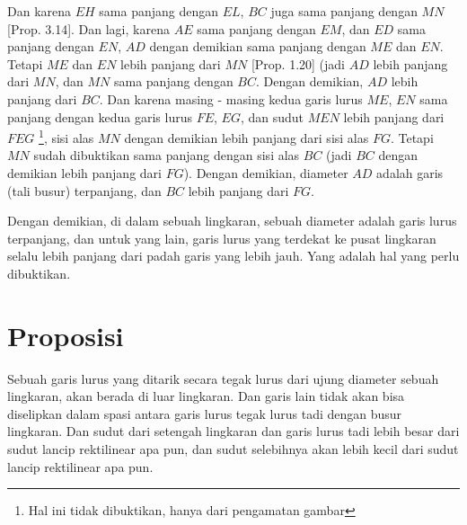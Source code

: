 \documentclass[a4paper]{book}
\begin{document}
Dan karena $EH$ sama panjang dengan $EL$, $BC$ juga sama panjang dengan $MN$
[Prop. 3.14]. Dan lagi, karena $AE$ sama panjang dengan $EM$, dan $ED$ sama 
panjang dengan $EN$, $AD$ dengan demikian sama panjang dengan $ME$ dan $EN$.
Tetapi $ME$ dan $EN$ lebih panjang dari $MN$ [Prop. 1.20] (jadi $AD$ lebih
panjang dari $MN$, dan $MN$ sama panjang dengan $BC$. Dengan demikian, $AD$
lebih panjang dari $BC$. Dan karena masing - masing kedua garis lurus $ME$, 
$EN$ sama panjang dengan kedua garis lurus $FE$, $EG$, dan sudut $MEN$ lebih
panjang dari $FEG$ \footnote{Hal ini tidak dibuktikan, hanya dari pengamatan
gambar}, sisi alas $MN$ dengan demikian lebih panjang dari sisi alas $FG$. Tetapi $MN$ sudah dibuktikan sama panjang dengan sisi alas $BC$ 
(jadi $BC$ dengan demikian lebih panjang dari $FG$). Dengan demikian, diameter
$AD$ adalah garis (tali busur) terpanjang, dan $BC$ lebih panjang dari $FG$.

Dengan demikian, di dalam sebuah lingkaran, sebuah diameter adalah garis lurus
terpanjang, dan untuk yang lain, garis lurus yang terdekat ke pusat lingkaran
selalu lebih panjang dari padah garis yang lebih jauh. Yang adalah hal yang
perlu dibuktikan.

\section*{\centering Proposisi \thesection}

Sebuah garis lurus yang ditarik secara tegak lurus dari ujung diameter sebuah 
lingkaran, akan berada di luar lingkaran. Dan garis lain tidak akan bisa
diselipkan dalam spasi  antara garis lurus tegak lurus tadi dengan busur 
lingkaran. Dan sudut dari setengah lingkaran dan garis lurus tadi lebih besar 
dari sudut lancip rektilinear apa pun, dan sudut selebihnya akan lebih kecil 
dari sudut lancip rektilinear apa pun.

\begin{center}
\end{center}
\end{document}
